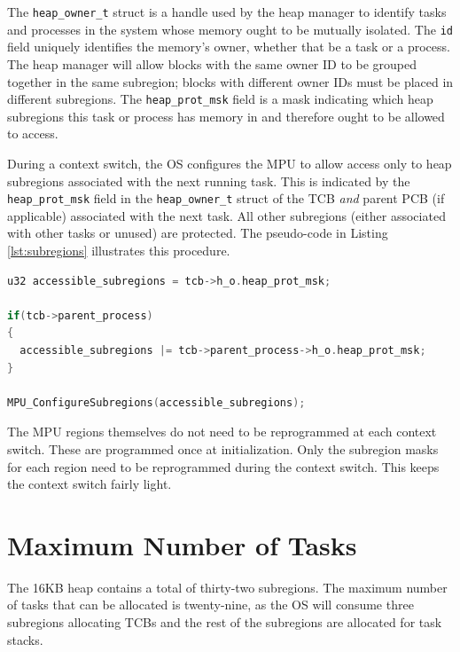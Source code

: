 The \texttt{heap\_owner\_t} struct is a handle used by the heap manager to identify tasks and processes in the system whose memory ought to be mutually isolated. The \texttt{id} field uniquely identifies the memory's owner, whether that be a task or a process. The heap manager will allow blocks with the same owner ID to be grouped together in the same subregion; blocks with different owner IDs must be placed in different subregions. The \texttt{heap\_prot\_msk} field is a mask indicating which heap subregions this task or process has memory in and therefore ought to be allowed to access.

During a context switch, the OS configures the MPU to allow access only to heap subregions associated with the next running task. This is indicated by the \texttt{heap\_prot\_msk} field in the \texttt{heap\_owner\_t} struct of the TCB \textit{and} parent PCB (if applicable) associated with the next task. All other subregions (either associated with other tasks or unused) are protected. The pseudo-code in Listing \ref{lst:subregions} illustrates this procedure.

\begin{lstlisting}[language=c, caption={Pseudo-code demonstrating how subregions are made accessible based on the TCB \textit{and} PCB.}, captionpos=b, label={lst:subregions}, float]
u32 accessible_subregions = tcb->h_o.heap_prot_msk;

if(tcb->parent_process)
{
  accessible_subregions |= tcb->parent_process->h_o.heap_prot_msk;
}

MPU_ConfigureSubregions(accessible_subregions);

\end{lstlisting}

The MPU regions themselves do not need to be reprogrammed at each context switch. These are programmed once at initialization. Only the subregion masks for each region need to be reprogrammed during the context switch. This keeps the context switch fairly light.

\section{Maximum Number of Tasks}

The 16KB heap contains a total of thirty-two subregions. The maximum number of tasks that can be allocated is twenty-nine, as the OS will consume three subregions allocating TCBs and the rest of the subregions are allocated for task stacks.


